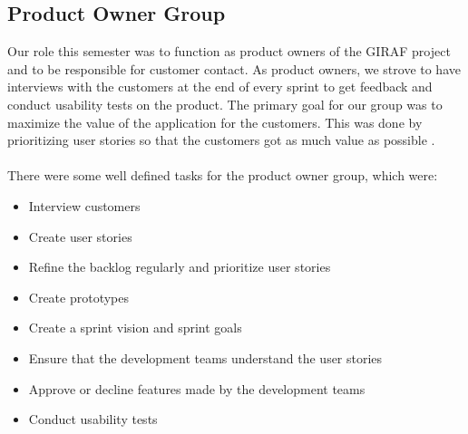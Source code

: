 \subsection{Product Owner Group}
Our role this semester was to function as product owners of the GIRAF project and to be responsible for customer contact. 
As product owners, we strove to have interviews with the customers at the end of every sprint to get feedback and conduct usability tests on the product.
The primary goal for our group was to maximize the value of the application for the customers. 
This was done by prioritizing user stories so that the customers got as much value as possible \autocite{TheScrumGuide}.\\
\\
There were some well defined tasks for the product owner group, which were:
\begin{itemize}
    \item Interview customers
    \item Create user stories    
    \item Refine the backlog regularly and prioritize user stories
    \item Create prototypes
    \item Create a sprint vision and sprint goals
    \item Ensure that the development teams understand the user stories
    \item Approve or decline features made by the development teams
    \item Conduct usability tests
\end{itemize}

